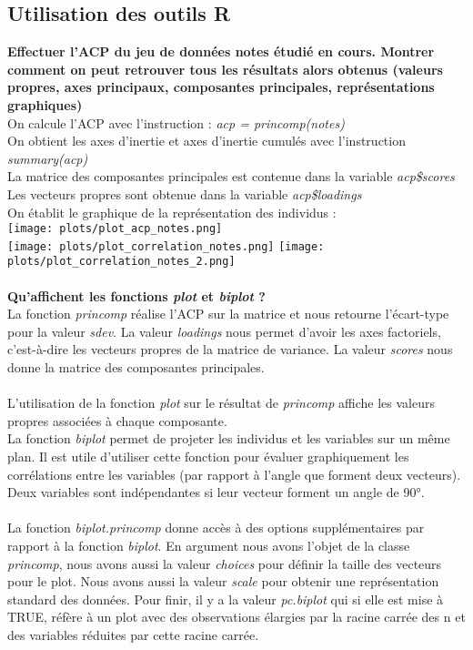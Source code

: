 \documentclass[a4paper, 10pt]{article}
\begin{document}
\subsection{Utilisation des outils R}
\textbf{Effectuer l'ACP du jeu de donn\'ees notes \'etudi\'e en cours. Montrer comment on peut retrouver tous les r\'esultats alors
obtenus (valeurs propres, axes principaux, composantes principales, repr\'esentations graphiques)}\\
On calcule l'ACP avec l'instruction : \textit{acp = princomp(notes)}\\
On obtient les axes d'inertie et axes d'inertie cumul\'es avec l'instruction \textit{summary(acp)}\\
La matrice des composantes principales est contenue dans la variable \textit{acp\$scores}\\
Les vecteurs propres sont obtenue dans la variable \textit{acp\$loadings}\\
On établit le graphique de la repr\'esentation des individus :\\
\texttt{[image: plots/plot\_acp\_notes.png]}\\
\texttt{[image: plots/plot\_correlation\_notes.png]}
\texttt{[image: plots/plot\_correlation\_notes\_2.png]}\\ \\
\textbf{Qu'affichent les fonctions \textit{plot} et \textit{biplot} ?}\\
La fonction \textit{princomp} r\'ealise l'ACP sur la matrice et nous retourne l'\'ecart-type pour la valeur \textit{sdev}.
La valeur \textit{loadings} nous permet d'avoir les axes factoriels, c'est-\`a-dire les vecteurs propres de la matrice de variance.
La valeur \textit{scores} nous donne la matrice des composantes principales.\\ \\
L'utilisation de la fonction \textit{plot} sur le r\'esultat de \textit{princomp} affiche les valeurs propres associ\'ees \`a chaque composante.\\
La fonction \textit{biplot} permet de projeter les individus et les variables sur un m\^eme plan.
Il est utile d'utiliser cette fonction pour \'evaluer graphiquement les corr\'elations entre les variables (par rapport \`a l'angle que forment
deux vecteurs). Deux variables sont ind\'ependantes si leur vecteur forment un angle de 90°.\\ \\
La fonction \textit{biplot.princomp} donne acc\`es \`a des options suppl\'ementaires par rapport \`a la fonction \textit{biplot}.
En argument nous avons l'objet de la classe \textit{princomp}, nous avons aussi la valeur \textit{choices} pour d\'efinir la taille des vecteurs
pour le plot. Nous avons aussi la valeur \textit{scale} pour obtenir une repr\'esentation standard des donn\'ees.
Pour finir, il y a la valeur \textit{pc.biplot} qui si elle est mise \`a TRUE, r\'ef\`ere \`a un plot avec des observations \'elargies par
la racine carr\'ee des n et des variables r\'eduites par cette racine carr\'ee.
\end{document}
